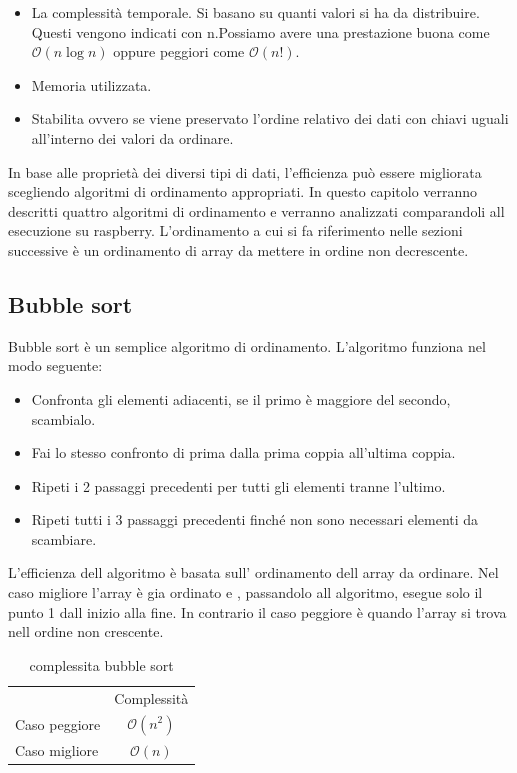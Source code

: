 \documentclass[12pt,a4paper]{report}
\begin{document}
\begin{itemize}
	\item La complessità temporale.  Si basano su quanti valori si ha da distribuire. Questi vengono indicati con n.Possiamo avere una prestazione buona come $\mathcal{O}(n\log{}n)$ oppure peggiori come $\mathcal{O}(n!)$.
	\item Memoria utilizzata.
	\item Stabilita ovvero se viene preservato l'ordine relativo dei dati con chiavi uguali all'interno dei valori da ordinare.
\end{itemize}

In base alle proprietà dei diversi tipi di dati, l'efficienza può essere migliorata scegliendo algoritmi di ordinamento appropriati. In questo capitolo verranno descritti quattro algoritmi di ordinamento e verranno analizzati comparandoli all esecuzione su raspberry. L'ordinamento a cui si fa riferimento nelle sezioni successive è un ordinamento di array da mettere in ordine non decrescente.

\subsection{Bubble sort}
Bubble sort è un semplice algoritmo di ordinamento. 
L'algoritmo funziona nel modo seguente:
\begin{itemize}
	\item Confronta gli elementi adiacenti, se il primo è maggiore del secondo, scambialo.
	\item Fai lo stesso confronto di prima dalla prima coppia all'ultima coppia. 
	\item Ripeti i 2 passaggi precedenti per tutti gli elementi tranne l'ultimo.
	\item Ripeti tutti i 3 passaggi precedenti finché non sono necessari elementi da scambiare.
\end{itemize}
L'efficienza dell algoritmo è basata sull' ordinamento dell array da ordinare. Nel caso migliore l'array è gia ordinato e , passandolo all algoritmo, esegue solo il punto 1 dall inizio alla fine. In contrario il caso peggiore è quando l'array si trova nell ordine non crescente.
\begin{table}[ht]
	\centering
	\begin{tabular}{lc}
              & Complessità \\
Caso peggiore &       $ \mathcal{O}(n^2)$      \\
Caso migliore &           $ \mathcal{O}(n)$   \\
\end{tabular}
	\caption{complessita bubble sort}
	\label{Tab:CompBubbleSort}
\end{table}
\end{document}
